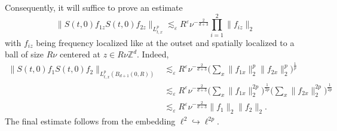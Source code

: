 \documentclass{amsart}
\theoremstyle{definition}
\newcommand{\Z}{\mathbb{Z}}
\begin{document}
Consequently, it will suffice to prove an estimate
\begin{equation}
\label{eq:LocalizedExpression}
\| S(t,0) f_{1 z} S(t,0) f_{2 z} \|_{L^p_{t,x}} \lesssim_\varepsilon R^{\varepsilon} \nu^{-\frac{2}{d+3}} \prod_{i=1}^2 \| f_{i z} \|_2
\end{equation}
with $f_{i z}$ being frequency localized like at the outset and spatially localized to a ball of size $R \nu$ centered at $z \in R \nu \Z^d$. Indeed,
\begin{equation*}
\begin{split}
\| S(t,0) f_1 S(t,0) f_2 \|_{L^{p}_{t,x}(B_{d+1}(0,R))} &\lesssim_\varepsilon R^{\varepsilon} \nu^{-\frac{2}{d+3}} \big( \sum_x \| f_{1x} \|_2^p \| f_{2x} \|_2^p \big)^{\frac{1}{p}} \\
&\lesssim_{\varepsilon} R^{\varepsilon} \nu^{-\frac{2}{d+3}} \big( \sum_x \| f_{1x} \|_2^{2p} \big)^{\frac{1}{2p}} \big( \sum_x \| f_{2x} \|_2^{2p} \big)^{\frac{1}{2p}} \\
&\lesssim_{\varepsilon} R^{\varepsilon} \nu^{-\frac{2}{d+3}} \| f_1 \|_2 \| f_2 \|_2.
\end{split}
\end{equation*}
The final estimate follows from the embedding $\ell^2 \hookrightarrow \ell^{2p}$.
\end{document}
